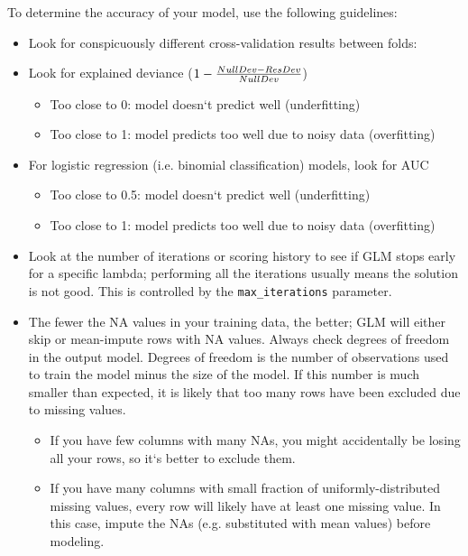 To determine the accuracy of your model, use the following guidelines: 

\begin{itemize}
\item Look for conspicuously different cross-validation results between folds:

\waterExampleInR



\waterExampleInPython


\item Look for explained deviance ($1 - {NullDev - ResDev \over NullDev}$) 
      \begin{itemize}
      \item Too close to 0:  model doesn`t predict well (underfitting)
      \item Too close to 1:  model predicts too well due to noisy data (overfitting)
      \end{itemize}


\item For logistic regression (i.e. binomial classification) models, look for AUC
      \begin{itemize}
      \item Too close to 0.5:  model doesn`t predict well (underfitting)
      \item Too close to 1:  model predicts too well due to noisy data (overfitting)
      \end{itemize}
\item Look at the number of iterations  or scoring history to see if GLM stops early for a specific
      lambda; performing all the iterations usually means the solution is not good.  This is
      controlled by the \texttt{max\_iterations} parameter.
\item The fewer the NA values in your training data, the better; GLM will either skip or mean-impute rows with NA values. Always check degrees of freedom in the output model. Degrees of freedom is the number of observations used to train the model minus the size of the model. If this number is much smaller than expected, it is likely that too many rows have been excluded due to missing values. 

      \begin{itemize}
      \item If you have few columns with many NAs, you might accidentally be losing all your rows, so it`s better to exclude them.
      \item If you have many columns with small fraction of uniformly-distributed missing values, every row will likely have at least one missing value. In this case, impute the NAs (e.g. substituted with mean values) before modeling.
      \end{itemize}
\end{itemize}
